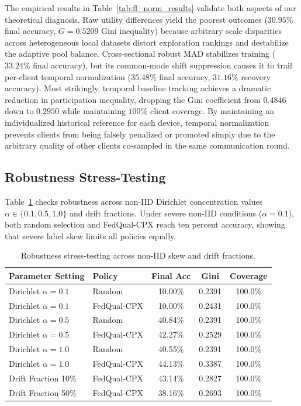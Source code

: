 \documentclass[conference]{IEEEtran}
\begin{document}
The empirical results in Table~\ref{tab:fl_norm_results} validate both aspects of our theoretical diagnosis. Raw utility differences yield the poorest outcomes ($30.95\%$ final accuracy, $G = 0.5209$ Gini inequality) because arbitrary scale disparities across heterogeneous local datasets distort exploration rankings and destabilize the adaptive pool balance. Cross-sectional robust MAD stabilizes training ($33.24\%$ final accuracy), but its common-mode shift suppression causes it to trail per-client temporal normalization ($35.48\%$ final accuracy, $31.16\%$ recovery accuracy). Most strikingly, temporal baseline tracking achieves a dramatic reduction in participation inequality, dropping the Gini coefficient from $0.4846$ down to $0.2950$ while maintaining $100\%$ client coverage. By maintaining an individualized historical reference for each device, temporal normalization prevents clients from being falsely penalized or promoted simply due to the arbitrary quality of other clients co-sampled in the same communication round.

\subsection{Robustness Stress-Testing}
Table~\ref{tab:robustness_results} checks robustness across non-IID Dirichlet concentration values $\alpha \in \{0.1, 0.5, 1.0\}$ and drift fractions. Under severe non-IID conditions ($\alpha = 0.1$), both random selection and FedQual-CPX reach ten percent accuracy, showing that severe label skew limits all policies equally.

\begin{table}[h]
\centering
\caption{Robustness stress-testing across non-IID skew and drift fractions.}
\label{tab:robustness_results}
\begin{tabular}{llccc}
\toprule
Parameter Setting & Policy & Final Acc & Gini & Coverage \\
\midrule
Dirichlet $\alpha = 0.1$ & Random & 10.00\% & 0.2391 & 100.0\% \\
Dirichlet $\alpha = 0.1$ & FedQual-CPX & 10.00\% & 0.2431 & 100.0\% \\
Dirichlet $\alpha = 0.5$ & Random & 40.84\% & 0.2391 & 100.0\% \\
Dirichlet $\alpha = 0.5$ & FedQual-CPX & 42.27\% & 0.2529 & 100.0\% \\
Dirichlet $\alpha = 1.0$ & Random & 40.55\% & 0.2391 & 100.0\% \\
Dirichlet $\alpha = 1.0$ & FedQual-CPX & 44.13\% & 0.3387 & 100.0\% \\
Drift Fraction 10\% & FedQual-CPX & 43.14\% & 0.2827 & 100.0\% \\
Drift Fraction 50\% & FedQual-CPX & 38.16\% & 0.2693 & 100.0\% \\
\bottomrule
\end{tabular}
\end{table}
\end{document}
